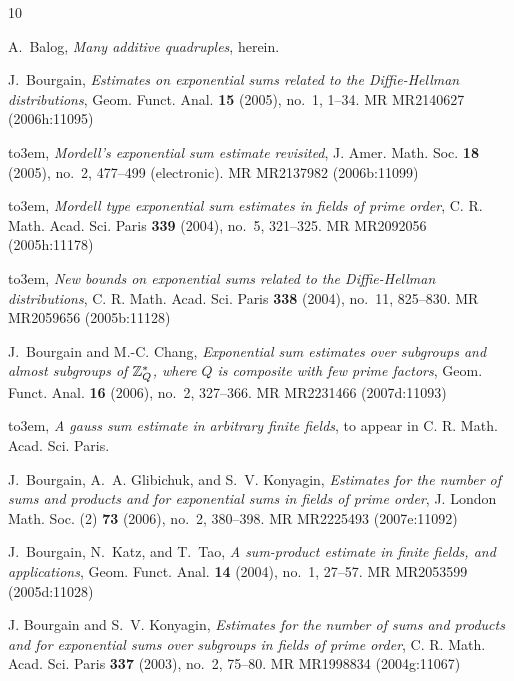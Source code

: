 \documentclass[11pt]{amsart}
\begin{document}
\providecommand{\bysame}{\leavevmode\hbox to3em{\hrulefill}\thinspace}
\providecommand{\MR}{\relax\ifhmode\unskip\space\fi MR }
\providecommand{\MRhref}[2]{%
  \href{http://www.ams.org/mathscinet-getitem?mr=#1}{#2}
}
\providecommand{\href}[2]{#2}
\begin{thebibliography}{10}

A.~Balog, \emph{Many additive quadruples}, herein.

J.~Bourgain, \emph{Estimates on exponential sums related to the
  {D}iffie-{H}ellman distributions}, Geom. Funct. Anal. \textbf{15} (2005),
  no.~1, 1--34. \MR{MR2140627 (2006h:11095)}

\bysame, \emph{Mordell's exponential sum estimate revisited}, J. Amer. Math.
  Soc. \textbf{18} (2005), no.~2, 477--499 (electronic). \MR{MR2137982
  (2006b:11099)}

\bysame, \emph{Mordell type exponential sum estimates in fields of prime
  order}, C. R. Math. Acad. Sci. Paris \textbf{339} (2004), no.~5, 321--325.
  \MR{MR2092056 (2005h:11178)}

\bysame, \emph{New bounds on exponential sums related to the {D}iffie-{H}ellman
  distributions}, C. R. Math. Acad. Sci. Paris \textbf{338} (2004), no.~11,
  825--830. \MR{MR2059656 (2005b:11128)}


J.~Bourgain and M.-C. Chang, \emph{Exponential sum estimates over subgroups and
  almost subgroups of {$\Bbb Z\sb Q\sp *$}, where {$Q$} is composite with few
  prime factors}, Geom. Funct. Anal. \textbf{16} (2006), no.~2, 327--366.
  \MR{MR2231466 (2007d:11093)}

\bysame, \emph{A gauss sum estimate in arbitrary finite
  fields}, to appear in C. R. Math. Acad. Sci. Paris.


J.~Bourgain, A.~A. Glibichuk, and S.~V. Konyagin, \emph{Estimates for the
  number of sums and products and for exponential sums in fields of prime
  order}, J. London Math. Soc. (2) \textbf{73} (2006), no.~2, 380--398.
  \MR{MR2225493 (2007e:11092)}

J.~Bourgain, N.~Katz, and T.~Tao, \emph{A sum-product estimate in finite
  fields, and applications}, Geom. Funct. Anal. \textbf{14} (2004), no.~1,
  27--57. \MR{MR2053599 (2005d:11028)}


J. Bourgain and S.~V. Konyagin, \emph{Estimates for the number of sums and
  products and for exponential sums over subgroups in fields of prime order},
  C. R. Math. Acad. Sci. Paris \textbf{337} (2003), no.~2, 75--80.
  \MR{MR1998834 (2004g:11067)}


\end{thebibliography}
\end{document}
